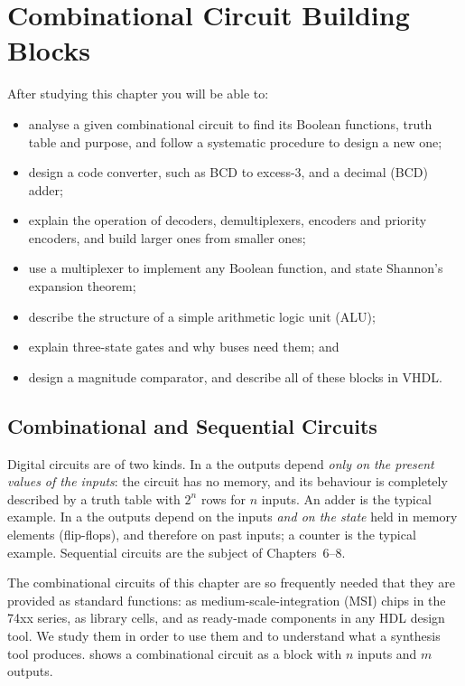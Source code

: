 \chapter{Combinational Circuit Building Blocks}\label{ch:blocks}

\begin{objectives}
After studying this chapter you will be able to:
\begin{itemize}
  \item analyse a given combinational circuit to find its Boolean functions, truth table and purpose, and follow a systematic procedure to design a new one;
  \item design a code converter, such as BCD to excess-3, and a decimal (BCD) adder;
  \item explain the operation of decoders, demultiplexers, encoders and priority encoders, and build larger ones from smaller ones;
  \item use a multiplexer to implement any Boolean function, and state Shannon's expansion theorem;
  \item describe the structure of a simple arithmetic logic unit (ALU);
  \item explain three-state gates and why buses need them; and
  \item design a magnitude comparator, and describe all of these blocks in VHDL.
\end{itemize}
\end{objectives}

\section{Combinational and Sequential Circuits}
Digital circuits are of two kinds. In a  the outputs depend \emph{only on the present values of the inputs}: the circuit has no memory, and its behaviour is completely described by a truth table with $2^n$ rows for $n$ inputs. An adder is the typical example. In a  the outputs depend on the inputs \emph{and on the state} held in memory elements (flip-flops), and therefore on past inputs; a counter is the typical example. Sequential circuits are the subject of Chapters~6--8.

The combinational circuits of this chapter are so frequently needed that they are provided as standard functions: as medium-scale-integration (MSI) chips in the 74xx series, as library cells, and as ready-made components in any HDL design tool. We study them in order to use them and to understand what a synthesis tool produces.  shows a combinational circuit as a block with $n$ inputs and $m$ outputs.

